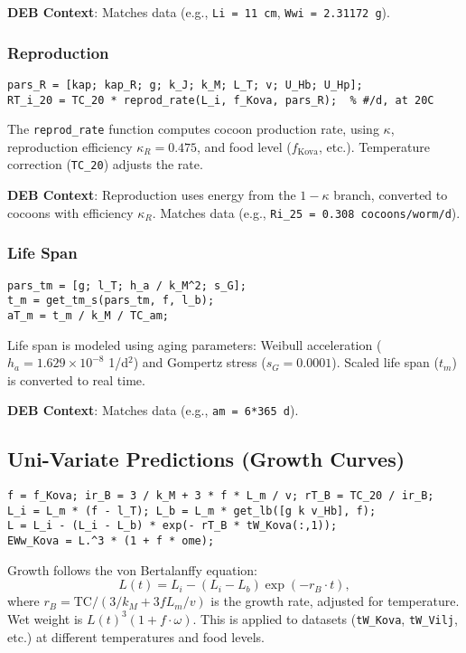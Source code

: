 \documentclass[11pt]{article}
\begin{document}
\textbf{DEB Context}: Matches data (e.g., \texttt{Li = 11 cm}, \texttt{Wwi = 2.31172 g}).

\subsubsection{Reproduction}
\begin{verbatim}
pars_R = [kap; kap_R; g; k_J; k_M; L_T; v; U_Hb; U_Hp];
RT_i_20 = TC_20 * reprod_rate(L_i, f_Kova, pars_R);  % #/d, at 20C
\end{verbatim}
The \texttt{reprod\_rate} function computes cocoon production rate, using $\kappa$, reproduction efficiency $\kappa_R = 0.475$, and food level ($f_{\text{Kova}}$, etc.). Temperature correction (\texttt{TC\_20}) adjusts the rate.

\textbf{DEB Context}: Reproduction uses energy from the $1-\kappa$ branch, converted to cocoons with efficiency $\kappa_R$. Matches data (e.g., \texttt{Ri\_25 = 0.308 cocoons/worm/d}).

\subsubsection{Life Span}
\begin{verbatim}
pars_tm = [g; l_T; h_a / k_M^2; s_G];
t_m = get_tm_s(pars_tm, f, l_b);
aT_m = t_m / k_M / TC_am;
\end{verbatim}
Life span is modeled using aging parameters: Weibull acceleration ($h_a = 1.629 \times 10^{-8}$ 1/d$^2$) and Gompertz stress ($s_G = 0.0001$). Scaled life span ($t_m$) is converted to real time.

\textbf{DEB Context}: Matches data (e.g., \texttt{am = 6*365 d}).

\subsection{Uni-Variate Predictions (Growth Curves)}
\begin{verbatim}
f = f_Kova; ir_B = 3 / k_M + 3 * f * L_m / v; rT_B = TC_20 / ir_B;
L_i = L_m * (f - l_T); L_b = L_m * get_lb([g k v_Hb], f);
L = L_i - (L_i - L_b) * exp(- rT_B * tW_Kova(:,1));
EWw_Kova = L.^3 * (1 + f * ome);
\end{verbatim}
Growth follows the von Bertalanffy equation:
\begin{equation}
L(t) = L_i - (L_i - L_b) \exp(-r_B \cdot t),
\end{equation}
where $r_B = \text{TC} / (3 / k_M + 3 f L_m / v)$ is the growth rate, adjusted for temperature. Wet weight is $L(t)^3 (1 + f \cdot \omega)$. This is applied to datasets (\texttt{tW\_Kova}, \texttt{tW\_Vilj}, etc.) at different temperatures and food levels.
\end{document}
